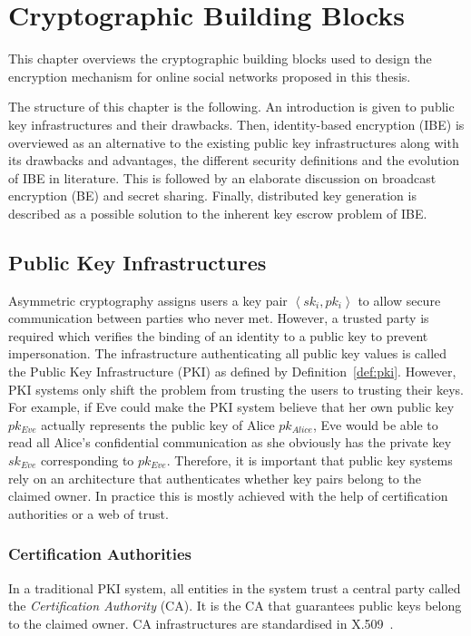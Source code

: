 \chapter{Cryptographic Building Blocks}
\label{cha:2}
This chapter overviews the cryptographic building blocks used to design the encryption mechanism for online social networks proposed in this thesis.

The structure of this chapter is the following. An introduction is given to public key infrastructures and their drawbacks. Then, identity-based encryption (IBE) is overviewed as an alternative to the existing public key infrastructures along with its drawbacks and advantages, the different security definitions and the evolution of IBE in literature. This is followed by an elaborate discussion on broadcast encryption (BE) and secret sharing. Finally, distributed key generation is described as a possible solution to the inherent key escrow problem of IBE.

\section{Public Key Infrastructures}
Asymmetric cryptography assigns users a key pair $\left< sk_i, pk_i \right>$ to allow secure communication between parties who never met. However, a trusted party is required which verifies the binding of an identity to a public key to prevent impersonation. The infrastructure authenticating all public key values is called the Public Key Infrastructure (PKI) as defined by Definition~\ref{def:pki}. However, PKI systems only shift the problem from trusting the users to trusting their keys. For example, if Eve could make the PKI system believe that her own public key $pk_{Eve}$ actually represents the public key of Alice $pk_{Alice}$, Eve would be able to read all Alice's confidential communication as she obviously has the private key $sk_{Eve}$ corresponding to $pk_{Eve}$. Therefore, it is important that public key systems rely on an architecture that authenticates whether key pairs belong to the claimed owner. In practice this is mostly achieved with the help of certification authorities or a web of trust.

\subsection{Certification Authorities}
In a traditional PKI system, all entities in the system trust a central party called the \textit{Certification Authority} (CA). It is the CA that guarantees public keys belong to the claimed owner. CA infrastructures are standardised in X.509~\cite{rfc4158}.


